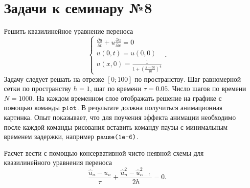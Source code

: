 \section{Задачи к семинару №8}
Решить квазилинейное уравнение переноса
\begin{equation} \label{c8eq1}
	\begin{cases}
		\displaystyle \frac{\partial u}{\partial t} + u \frac{\partial u}{\partial x} = 0 \\
		u(0,t) = u(0,0) \\
		\displaystyle u(x,0) = \frac{1}{1 + \left( \displaystyle \frac{x-50}{10} \right)^4}
	\end{cases}.
\end{equation}
Задачу следует решать на отрезке $[0; 100]$ по пространству. Шаг равномерной сетки по пространству $h = 1$, шаг по времени $\tau = 0.05$. Число шагов по времени $N = 1000$. На каждом временном слое отображать решение на графике с помощью команды $\texttt{\lstinline|plot|}$. В результате должна получиться анимационная картинка. Опыт показывает, что для поучения эффекта анимации необходимо после каждой команды рисования вставить команду паузы с минимальным временем задержки, например $\texttt{\lstinline|pause(1e-6)|}$.

Расчет вести с помощью консервативной чисто неявной схемы для квазилинейного уравнения переноса
\begin{equation} \label{c8eq2}
	\frac{\hat{u}_n - u_n}{\tau} + \frac{\hat{u}^2_n - \hat{u}^2_{n-1}}{2h} = 0.	
\end{equation}


